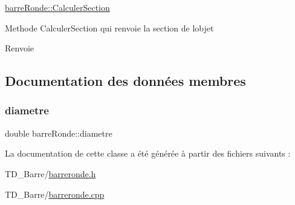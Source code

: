 \hyperlink{classbarre_ronde_aab6bddac0a3e8b9eb43d35903f5b4bc4}{barre\+Ronde\+::\+Calculer\+Section} 

Methode Calculer\+Section qui renvoie la section de l\textquotesingle{}objet \begin{DoxyReturn}{Renvoie}

\end{DoxyReturn}


\subsection{Documentation des données membres}
\mbox{\label{classbarre_ronde_a351f886cdb9bd89132c1ae839f1e9f2e}} 
\subsubsection{\texorpdfstring{diametre}{diametre}}
{\footnotesize\ttfamily double barre\+Ronde\+::diametre\hspace{0.3cm}{\ttfamily [protected]}}



La documentation de cette classe a été générée à partir des fichiers suivants \+:\begin{DoxyCompactItemize}
\item 
T\+D\+\_\+\+Barre/\hyperlink{barreronde_8h}{barreronde.\+h}\item 
T\+D\+\_\+\+Barre/\hyperlink{barreronde_8cpp}{barreronde.\+cpp}\end{DoxyCompactItemize}
